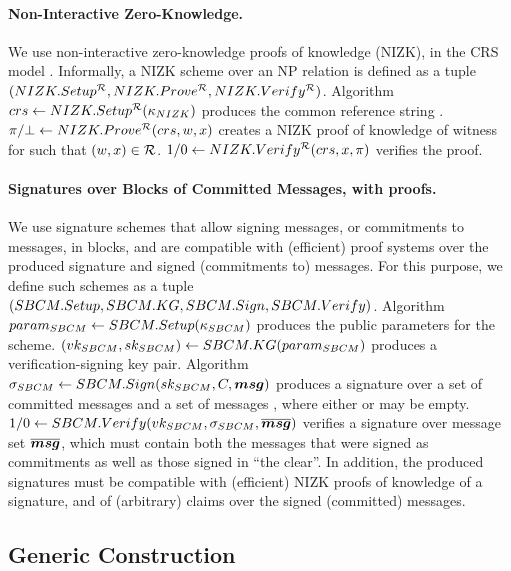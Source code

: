 \paragraph{Non-Interactive Zero-Knowledge.} %
We use non-interactive zero-knowledge proofs of knowledge (NIZK), in the CRS
model \needcite. Informally, a NIZK scheme over an NP relation \NIZKRel is
defined as a tuple $(NIZK.Setup^\mathcal{R},NIZK.Prove^\mathcal{R},
NIZK.Verify^\mathcal{R})$. Algorithm $crs \gets NIZK.Setup^\mathcal{R}
(\kappa_{NIZK})$ produces the common reference string \NIZKcrs. $\pi/\bot
\gets NIZK.Prove^\mathcal{R}(crs,w,x)$ creates a NIZK proof of
knowledge of witness \NIZKw for \NIZKx such that $(w,x) \in \mathcal{R}$.
$1/0 \gets NIZK.Verify^\mathcal{R}(crs,x,\pi)$ verifies the proof.

\paragraph{Signatures over Blocks of Committed Messages, with proofs.} %
We use signature schemes that allow signing messages, or commitments to messages,
in blocks, and are compatible with (efficient) proof systems over the produced
signature and signed (commitments to) messages. For this purpose, we define such
schemes as a tuple $(SBCM.Setup,SBCM.KG,SBCM.Sign,SBCM.Verify)$. Algorithm
$param_{SBCM} \gets SBCM.Setup(\kappa_{SBCM})$ produces the public parameters for the
scheme. $(vk_{SBCM},sk_{SBCM}) \gets SBCM.KG(param_{SBCM})$ produces a
verification-signing key
pair. Algorithm $\sigma_{SBCM} \gets SBCM.Sign(sk_{SBCM},C,\boldsymbol{msg})$ produces a
signature over a set of committed messages \Ccom and a set of messages
\msgset, where either \Ccom or \msgset may be empty. $1/0 \gets
SBCM.Verify(vk_{SBCM},\sigma_{SBCM},\overline{\boldsymbol{msg}})$ verifies a signature \SBCMsig
over message set $\overline{\boldsymbol{msg}}$, which must contain both the messages that
were signed as commitments as well as those signed in ``the clear''. In
addition, the produced signatures must be compatible with (efficient) NIZK
proofs of knowledge of a signature, and of (arbitrary) claims over the signed
(committed) messages.

\subsection{Generic Construction \CUASGen}
\label{ssec:generic-construction-uas}

